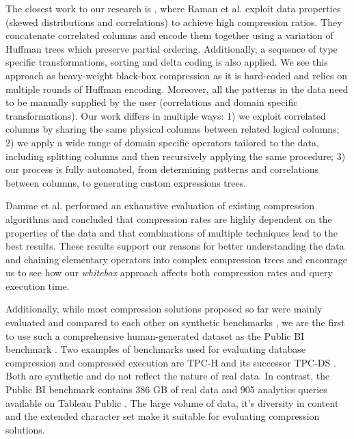 The closest work to our research is \cite{raman2006wring}, where Raman et al. exploit data properties (skewed distributions and correlations) to achieve high compression ratios. They concatenate correlated columns and encode them together using a variation of Huffman trees which preserve partial ordering. Additionally, a sequence of type specific transformations, sorting and delta coding is also applied. We see this approach as heavy-weight black-box compression as it is hard-coded and relies on multiple rounds of Huffman encoding. Moreover, all the patterns in the data need to be manually supplied by the user (correlations and domain specific transformations). Our work differs in multiple ways: 1) we exploit correlated columns by sharing the same physical columns between related logical columns; 2) we apply a wide range of domain specific operators tailored to the data, including splitting columns and then recursively applying the same procedure; 3) our process is fully automated, from determining patterns and correlations between columns, to generating custom expressions trees.

Damme et al. \cite{damme2017lightweight} performed an exhaustive evaluation of existing compression algorithms and concluded that compression rates are highly dependent on the properties of the data and that combinations of multiple techniques lead to the best results. These results support our reasons for better understanding the data and chaining elementary operators into complex compression trees and encourage us to see how our \textit{whitebox} approach affects both compression rates and query execution time.

Additionally, while most compression solutions proposed so far were mainly evaluated and compared to each other on synthetic benchmarks \cite{abadi2006integrating,zukowski2006super,lee2014joins,lang2016data,raman2013db2}, we are the first to use such a comprehensive human-generated dataset as the Public BI benchmark \cite{pbib}. Two examples of benchmarks used for evaluating database compression and compressed execution are TPC-H \cite{boncz2013tpc} and its successor TPC-DS \cite{nambiar2006making}. Both are synthetic and do not reflect the nature of real data. In contrast, the Public BI benchmark contains 386 GB of real data and 905 analytics queries available on Tableau Public \cite{vogelsgesang2018get, tableaupublic}. The large volume of data, it’s diversity in content and the extended character set make it suitable for evaluating compression solutions.

